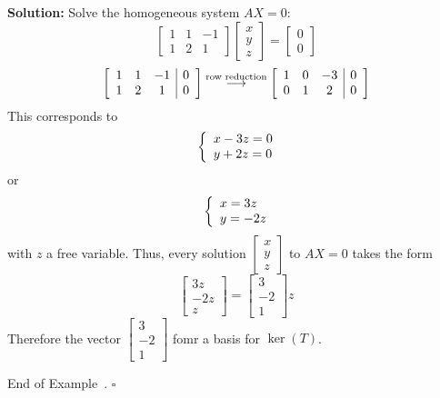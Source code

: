 \documentclass[10pt]{article}
\newenvironment{augmentedmatrix}[1] %
{\left[\begin{array}{#1}}
    {\end{array}\right]}
\theoremstyle{definition}
\newtheorem{example}[theorem]{Example}
\renewenvironment{example}
{\begin{oldexample}}
  {\par\smallskip\hfill   End of Example~\theexample. $\square$    \par\end{oldexample}}
\newcommand{\Fl}[1]{\vspace{5mm}\noindent\textbf{#1}}%
\begin{document}
\begin{example}
  \Fl{Solution:} Solve the homogeneous system $AX=0$:
  \begin{equation*}
    \begin{bmatrix}
      1&1&-1\\1&2&1
    \end{bmatrix}
    \begin{bmatrix}
      x\\y\\z
    \end{bmatrix}
    =
    \begin{bmatrix}
      0\\0
    \end{bmatrix}
  \end{equation*}
  \begin{equation*}
    \begin{augmentedmatrix}{ccc|c}
      1&1&-1&0\\
      1&2&1&0
    \end{augmentedmatrix}
    \overset{\text{row reduction}}{\longrightarrow}
    \begin{augmentedmatrix}{ccc|c}
      1&0&-3&0\\
      0&1&2&0
    \end{augmentedmatrix}
  \end{equation*}
  This corresponds to
  \begin{equation*}
    \left\{ \begin{array}{l@{}l} x-3z=0 \\ y+2z=0 \end{array}\right.
  \end{equation*}
  or
  \begin{equation*}
    \left\{ \begin{array}{l@{}l} x=3z \\ y=-2z \end{array}\right.
  \end{equation*}
  with $z$ a free variable. Thus, every solution $
  \begin{bmatrix}
    x\\y\\z
  \end{bmatrix}
  $ to $AX=0$ takes the form
  \begin{equation*}
    \begin{bmatrix}
      3z\\-2z\\z
    \end{bmatrix} =
    \begin{bmatrix}
      3\\-2\\1
    \end{bmatrix}z
  \end{equation*}
  Therefore the vector $
  \begin{bmatrix}
    3\\-2\\1
  \end{bmatrix}
  $ fomr a basis for $\ker(T)$.
\end{example}
\end{document}

